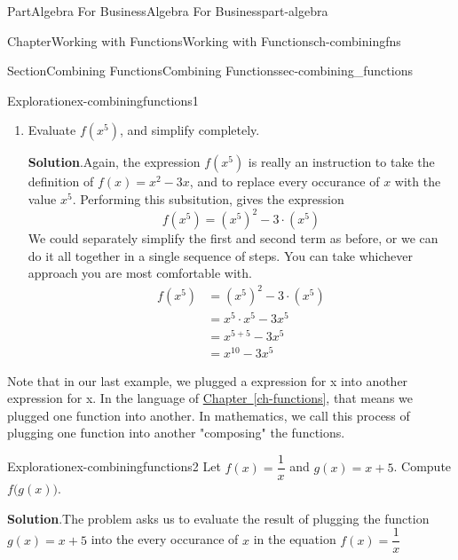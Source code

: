 \documentclass[oneside,10pt,]{tufte-book}
\newcommand{\blocktitlefont}{\relax}
\newcommand{\xreffont}{\relax}
\newcommand{\alert}[1]{\textbf{\textit{#1}}}
\numberwithin{equation}{chapter}
\newcommand{\amp}{&}
\begin{document}
\begin{partptx}{Part}{Algebra For Business}{}{Algebra For Business}{}{}{part-algebra}
\begin{chapterptx}{Chapter}{Working with Functions}{}{Working with Functions}{}{}{ch-combiningfns}
\begin{sectionptx}{Section}{Combining Functions}{}{Combining Functions}{}{}{sec-combining_functions}
\begin{exploration}{Exploration}{}{ex-combiningfunctions1}
\begin{enumerate}[font=\bfseries,label=(\alph*),ref=\alph*]
Putting it all together we get%
\begin{align*}
f(5+h)   \amp=  (5+h)^2 - 3\cdot (5+h) \\
\amp= (25+10h+h^2) - (15+3h) \\
\amp= 25 + 10h + h^2 - 15 - 3h \\
\amp= 10 + 7h + h^2 
\end{align*}
\alert{Note:} Whenever substituing an expression into another expression, such as when we substitued the simplifications for \((5+h)^2\) and \(3\cdot (5+h)\) above, you must always include parentheses around each term.  Above, that helped us remember that we needed to distribute the subtraction to \emph{both} terms of \(15+3h\).%
\item{}Evaluate \(f(x^5)\), and simplify completely.%
\par\smallskip%
\noindent\textbf{\blocktitlefont Solution}.\hypertarget{ex-combiningfunctions1-4-2}{}\quad{}Again, the expression \(f(x^5)\) is really an instruction to take the definition of \(f(x) = x^2 - 3x\), and to replace every occurance of \(x\) with the value \(x^5\).  Performing this subsitution, gives the expression%
\begin{equation*}
f(x^5) = (x^5)^2 - 3\cdot (x^5)
\end{equation*}
We could separately simplify the first and second term as before, or we can do it all together in a single sequence of steps.  You can take whichever approach you are most comfortable with.%
\begin{align*}
f(x^5) \amp= (x^5)^2 - 3\cdot (x^5) \\
\amp= x^5 \cdot x^5 - 3 x^5 \\
\amp= x^{5+5} - 3x^5 \\
\amp= x^{10} - 3x^5 
\end{align*}
%
\end{enumerate}%
\end{exploration}%
Note that in our last example, we plugged a expression for x into another expression for x. In the language of \hyperref[ch-functions]{Chapter~{\xreffont\ref{ch-functions}}}, that means we plugged one function into another.  In mathematics, we call this process of plugging one function into another "composing" the functions.%
\begin{exploration}{Exploration}{}{ex-combiningfunctions2}%
Let \(f(x) = \dfrac{1}{x}\) and \(g(x) = x+5\).  Compute \(f\Big(g(x)\Big)\).%
\par\smallskip%
\noindent\textbf{\blocktitlefont Solution}.\hypertarget{ex-combiningfunctions2-2}{}\quad{}The problem asks us to evaluate the result of plugging the  function \(g(x)=x+5\) into the every occurance of \(x\) in the equation \(f(x) = \dfrac{1}{x}\)%

\end{exploration}
\end{sectionptx}
\end{chapterptx}
\end{partptx}
\end{document}
